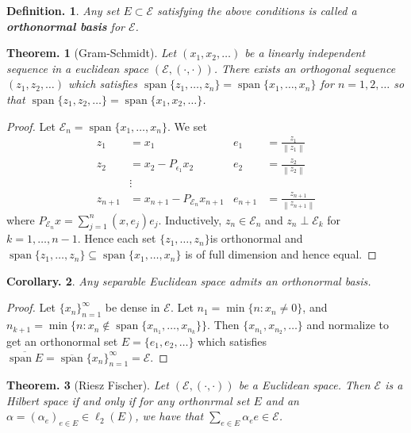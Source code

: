 \documentclass[11pt, a4paper]{memoir}
\newcommand{\norm}[1]{\ensuremath{\left\lVert#1\right\rVert}}
\theoremstyle{change}
\newtheorem{theorem}{Theorem.}[section]
\newtheorem{corollary}[theorem]{Corollary.}
\theoremstyle{plain}
\theoremstyle{nonumberplain}
\newtheorem{definition}{Definition.}
\newtheorem{proof}{Proof}
\DeclareMathOperator{\spn}{span}
\newcommand{\inr}[1]{\ensuremath{\left(#1\right)}}
\numberwithin{equation}{section}
\begin{document}
\begin{definition}
    Any set $E\subset\mathcal{E}$ satisfying the above conditions is called a \textbf{orthonormal basis} for $\mathcal{E}$.
\end{definition}
\begin{theorem}[Gram-Schmidt]
    Let $(x_1,x_2,\ldots)$ be a linearly independent sequence in a euclidean space $(\mathcal{E},\inr{\cdot,\cdot})$.
    There exists an orthogonal sequence $(z_1,z_2,\ldots)$ which satisfies $\spn\{z_1,\ldots,z_n\}=\spn\{x_1,\ldots,x_n\}$ for $n=1,2,\ldots$ so that $\spn\{z_1,z_2,\ldots\}=\spn\{x_1,x_2,\ldots\}$.
\end{theorem}
\begin{proof}
    Let $\mathcal{E}_n=\spn\{x_1,\ldots,x_n\}$.
    We set
    \begin{align*}
        z_1&=x_1 & e_1 &=\frac{z_1}{\norm{z_1}}\\
        z_2&=x_2-P_{\epsilon_1}x_2 & e_2&=\frac{z_2}{\norm{z_2}}\\
           &\vdots\\
        z_{n+1}&=x_{n+1}-P_{\mathcal{E}_n}x_{n+1} & e_{n+1}&=\frac{z_{n+1}}{\norm{z_{n+1}}}
    \end{align*}
    where $P_{\mathcal{E}_n}x=\sum_{j=1}^n\inr{x,e_j}e_j$.
    Inductively, $z_n\in\mathcal{E}_n$ and $z_n\perp\mathcal{E}_k$ for $k=1,\ldots,n-1$.
    Hence each set $\{z_1,\ldots,z_n\}$is orthonormal and $\spn\{z_1,\ldots,z_n\}\subseteq\spn\{x_1,\ldots,x_n\}$ is of full dimension and hence equal.
\end{proof}
\begin{corollary}
    Any separable Euclidean space admits an orthonormal basis.
\end{corollary}
\begin{proof}
    Let $\{x_n\}_{n=1}^\infty$ be dense in $\mathcal{E}$.
    Let $n_1=\min\{n:x_n\neq 0\}$, and $n_{k+1}=\min\{n:x_n\notin\spn\{x_{n_1},\ldots,x_{n_k}\}\}$.
    Then $\{x_{n_1},x_{n_2},\ldots\}$ and normalize to get an orthonormal set $E=\{e_1,e_2,\ldots\}$ which satisfies $\overline{\spn E}=\overline{\spn}\{x_n\}_{n=1}^\infty=\mathcal{E}$.
\end{proof}
\begin{theorem}[Riesz Fischer]
    Let $(\mathcal{E},\inr{\cdot,\cdot})$ be a Euclidean space.
    Then $\mathcal{E}$ is a Hilbert space if and only if for any orthonrmal set $E$ and an $\alpha=(\alpha_e)_{e\in E}\in\ell_2(E)$, we have that $\sum_{e\in E}\alpha_ee\in\mathcal{E}$.
\end{theorem}
\end{document}
